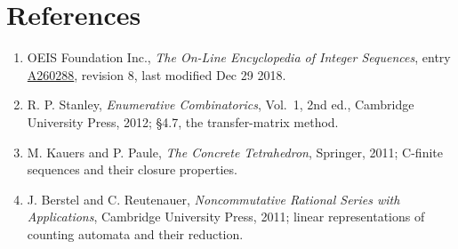 \documentclass[11pt]{article}
\theoremstyle{definition}
\begin{document}
\section{References}

\begin{enumerate}

\item OEIS Foundation Inc., \emph{The On-Line Encyclopedia of Integer Sequences}, entry \href{https://oeis.org/A260288}{A260288}, revision 8, last modified Dec 29 2018.

\item R. P. Stanley, \emph{Enumerative Combinatorics}, Vol.~1, 2nd ed., Cambridge University Press, 2012; \S4.7, the transfer-matrix method.

\item M. Kauers and P. Paule, \emph{The Concrete Tetrahedron}, Springer, 2011; C-finite sequences and their closure properties.

\item J. Berstel and C. Reutenauer, \emph{Noncommutative Rational Series with Applications}, Cambridge University Press, 2011; linear representations of counting automata and their reduction.

\end{enumerate}
\end{document}
